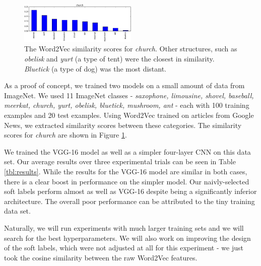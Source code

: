 \begin{figure}[!tb]
  \centering
  \includegraphics[width=0.5\textwidth]{figs/word2vec_church.png}
  \caption{
    The Word2Vec similarity scores for \emph{church}. Other structures, such as
    \emph{obelisk} and \emph{yurt} (a type of tent) were the closest in
    similarity. \emph{Bluetick} (a type of dog) was the most distant.
  }
  \label{fig:word2vec_similarities}
\end{figure}

As a proof of concept, we trained two models on a small amount of data from
ImageNet. We used 11 ImageNet classes -
\emph{
  saxophone,
  limousine,
  shovel,
  baseball,
  meerkat,
  church,
  yurt,
  obelisk,
  bluetick,
  mushroom,
  ant
} -
each with 100 training examples and 20 test examples.
Using Word2Vec trained on articles from Google News, we extracted similarity
scores between these categories. The similarity scores for \emph{church} are
shown in Figure \ref{fig:word2vec_similarities}.

We trained the VGG-16 model as well as a simpler four-layer CNN on this data
set. Our average results over three experimental trials can be seen in Table
\ref{tbl:results}.
While the results for the VGG-16 model are similar in both cases, there is a
clear boost in performance on the simpler model. Our naivly-selected soft
labels perform almost as well as VGG-16 despite being a significantly inferior
architecture.
The overall poor performance can be attributed to the tiny training data set.

Naturally, we will run experiments with much larger training sets and we will
search for the best hyperparameters.
We will also work on improving the design of the soft labels, which were not
adjusted at all for this experiment - we just took the cosine similarity
between the raw Word2Vec features.



%
